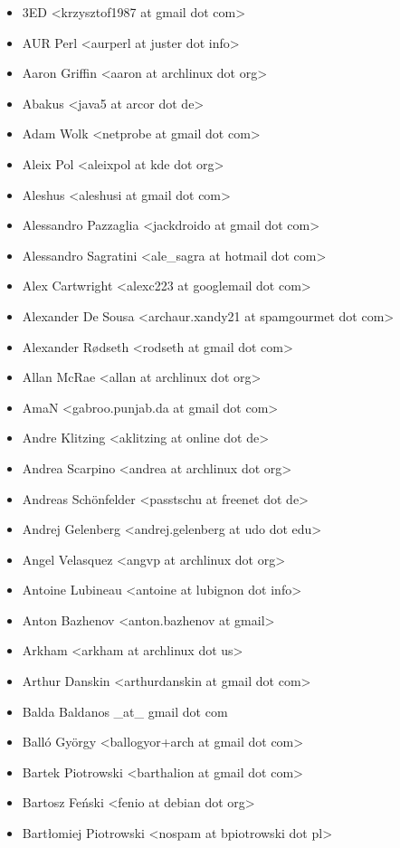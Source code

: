\begin{itemize}
\item  3ED <krzysztof1987 at gmail dot com>
\item  AUR Perl <aurperl at juster dot info>
\item  Aaron Griffin <aaron at archlinux dot org>
\item  Abakus <java5 at arcor dot de>
\item  Adam Wolk <netprobe at gmail dot com>
\item  Aleix Pol <aleixpol at kde dot org>
\item  Aleshus <aleshusi at gmail dot com>
\item  Alessandro Pazzaglia <jackdroido at gmail dot com>
\item  Alessandro Sagratini <ale\_sagra at hotmail dot com>
\item  Alex Cartwright <alexc223 at googlemail dot com>
\item  Alexander De Sousa <archaur.xandy21 at spamgourmet dot com>
\item  Alexander Rødseth <rodseth at gmail dot com>
\item  Allan McRae <allan at archlinux dot org>
\item  AmaN <gabroo.punjab.da at gmail dot com>
\item  Andre Klitzing <aklitzing at online dot de>
\item  Andrea Scarpino <andrea at archlinux dot org>
\item  Andreas Schönfelder <passtschu at freenet dot de>
\item  Andrej Gelenberg <andrej.gelenberg at udo dot edu>
\item  Angel Velasquez <angvp at archlinux dot org>
\item  Antoine Lubineau <antoine at lubignon dot info>
\item  Anton Bazhenov <anton.bazhenov at gmail>
\item  Arkham <arkham at archlinux dot us>
\item  Arthur Danskin <arthurdanskin at gmail dot com>
\item  Balda Baldanos \_at\_ gmail dot com
\item  Balló György <ballogyor+arch at gmail dot com>
\item  Bartek Piotrowski <barthalion at gmail dot com>
\item  Bartosz Feński <fenio at debian dot org>
\item  Bartłomiej Piotrowski <nospam at bpiotrowski dot pl>

\end{itemize}
